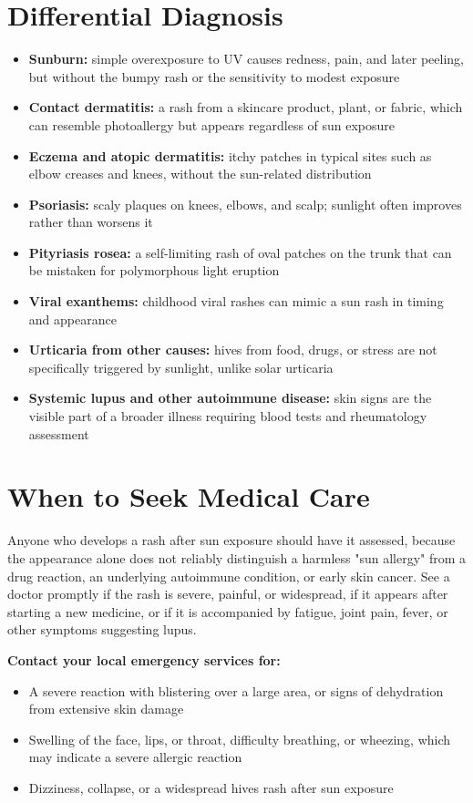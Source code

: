 \section*{Differential Diagnosis}
\begin{itemize}
    \item \textbf{Sunburn:} simple overexposure to UV causes redness, pain, and later peeling, but without the bumpy rash or the sensitivity to modest exposure
    \item \textbf{Contact dermatitis:} a rash from a skincare product, plant, or fabric, which can resemble photoallergy but appears regardless of sun exposure
    \item \textbf{Eczema and atopic dermatitis:} itchy patches in typical sites such as elbow creases and knees, without the sun-related distribution
    \item \textbf{Psoriasis:} scaly plaques on knees, elbows, and scalp; sunlight often improves rather than worsens it
    \item \textbf{Pityriasis rosea:} a self-limiting rash of oval patches on the trunk that can be mistaken for polymorphous light eruption
    \item \textbf{Viral exanthems:} childhood viral rashes can mimic a sun rash in timing and appearance
    \item \textbf{Urticaria from other causes:} hives from food, drugs, or stress are not specifically triggered by sunlight, unlike solar urticaria
    \item \textbf{Systemic lupus and other autoimmune disease:} skin signs are the visible part of a broader illness requiring blood tests and rheumatology assessment
\end{itemize}

\section*{When to Seek Medical Care}
Anyone who develops a rash after sun exposure should have it assessed, because the appearance alone does not reliably distinguish a harmless "sun allergy" from a drug reaction, an underlying autoimmune condition, or early skin cancer. See a doctor promptly if the rash is severe, painful, or widespread, if it appears after starting a new medicine, or if it is accompanied by fatigue, joint pain, fever, or other symptoms suggesting lupus.

\textbf{Contact your local emergency services for:}
\begin{itemize}
    \item A severe reaction with blistering over a large area, or signs of dehydration from extensive skin damage
    \item Swelling of the face, lips, or throat, difficulty breathing, or wheezing, which may indicate a severe allergic reaction
    \item Dizziness, collapse, or a widespread hives rash after sun exposure
\end{itemize}

